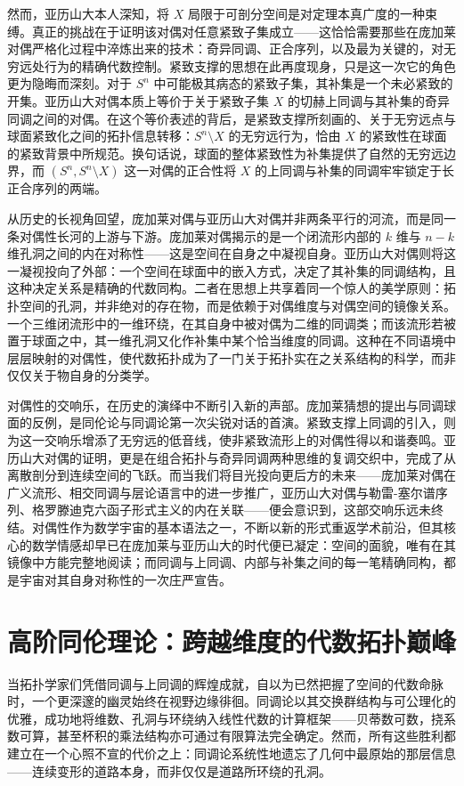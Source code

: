 \documentclass[12pt,a4paper]{article}
\begin{document}
然而，亚历山大本人深知，将 $X$ 局限于可剖分空间是对定理本真广度的一种束缚。真正的挑战在于证明该对偶对任意紧致子集成立——这恰恰需要那些在庞加莱对偶严格化过程中淬炼出来的技术：奇异同调、正合序列，以及最为关键的，对无穷远处行为的精确代数控制。紧致支撑的思想在此再度现身，只是这一次它的角色更为隐晦而深刻。对于 $S^n$ 中可能极其病态的紧致子集，其补集是一个未必紧致的开集。亚历山大对偶本质上等价于关于紧致子集 $X$ 的切赫上同调与其补集的奇异同调之间的对偶。在这个等价表述的背后，是紧致支撑所刻画的、关于无穷远点与球面紧致化之间的拓扑信息转移：$S^n \setminus X$ 的无穷远行为，恰由 $X$ 的紧致性在球面的紧致背景中所规范。换句话说，球面的整体紧致性为补集提供了自然的无穷远边界，而 $(S^n, S^n \setminus X)$ 这一对偶的正合性将 $X$ 的上同调与补集的同调牢牢锁定于长正合序列的两端。

从历史的长视角回望，庞加莱对偶与亚历山大对偶并非两条平行的河流，而是同一条对偶性长河的上游与下游。庞加莱对偶揭示的是一个闭流形内部的 $k$ 维与 $n-k$ 维孔洞之间的内在对称性——这是空间在自身之中凝视自身。亚历山大对偶则将这一凝视投向了外部：一个空间在球面中的嵌入方式，决定了其补集的同调结构，且这种决定关系是精确的代数同构。二者在思想上共享着同一个惊人的美学原则：拓扑空间的孔洞，并非绝对的存在物，而是依赖于对偶维度与对偶空间的镜像关系。一个三维闭流形中的一维环绕，在其自身中被对偶为二维的同调类；而该流形若被置于球面之中，其一维孔洞又化作补集中某个恰当维度的同调。这种在不同语境中层层映射的对偶性，使代数拓扑成为了一门关于拓扑实在之关系结构的科学，而非仅仅关于物自身的分类学。

对偶性的交响乐，在历史的演绎中不断引入新的声部。庞加莱猜想的提出与同调球面的反例，是同伦论与同调论第一次尖锐对话的首演。紧致支撑上同调的引入，则为这一交响乐增添了无穷远的低音线，使非紧致流形上的对偶性得以和谐奏鸣。亚历山大对偶的证明，更是在组合拓扑与奇异同调两种思维的复调交织中，完成了从离散剖分到连续空间的飞跃。而当我们将目光投向更后方的未来——庞加莱对偶在广义流形、相交同调与层论语言中的进一步推广，亚历山大对偶与勒雷-塞尔谱序列、格罗滕迪克六函子形式主义的内在关联——便会意识到，这部交响乐远未终结。对偶性作为数学宇宙的基本语法之一，不断以新的形式重返学术前沿，但其核心的数学情感却早已在庞加莱与亚历山大的时代便已凝定：空间的面貌，唯有在其镜像中方能完整地阅读；而同调与上同调、内部与补集之间的每一笔精确同构，都是宇宙对其自身对称性的一次庄严宣告。

\section{高阶同伦理论：跨越维度的代数拓扑巅峰}

当拓扑学家们凭借同调与上同调的辉煌成就，自以为已然把握了空间的代数命脉时，一个更深邃的幽灵始终在视野边缘徘徊。同调论以其交换群结构与可公理化的优雅，成功地将维数、孔洞与环绕纳入线性代数的计算框架——贝蒂数可数，挠系数可算，甚至杯积的乘法结构亦可通过有限算法完全确定。然而，所有这些胜利都建立在一个心照不宣的代价之上：同调论系统性地遗忘了几何中最原始的那层信息——连续变形的道路本身，而非仅仅是道路所环绕的孔洞。
\end{document}
